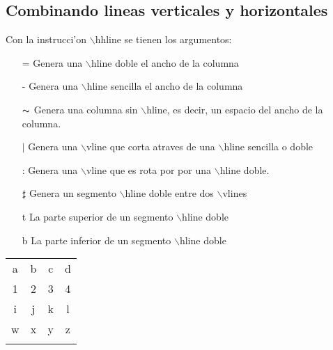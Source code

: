\documentclass [spanish,12pt]{article}
\begin{document}
\subsection{Combinando lineas verticales y horizontales}

Con la instrucci'on $\backslash$hhline se tienen los argumentos:

\begin{itemize}     %
\item[=] Genera una $\backslash$hline doble el ancho de la columna
\item[-] Genera una $\backslash$hline sencilla el ancho de la columna
\item[$\thicksim$] Genera una columna sin $\backslash$hline, es decir, un espacio del 
ancho de la columna.
\item[$|$] Genera una $\backslash$vline que corta atraves de una 
$\backslash$hline sencilla o doble
\item[:] Genera una $\backslash$vline que es rota por por una 
$\backslash$hline doble.
\item[$\sharp$] Genera un segmento $\backslash$hline doble entre dos 
$\backslash$vlines
\item[t] La parte superior de un segmento $\backslash$hline doble
\item[b] La parte inferior de un segmento $\backslash$hline doble
\end{itemize}

\setlength{\arrayrulewidth}{.8pt} %
\begin{tabular}{||cc||c|c||}
\hhline{|t:==:t:==:t|} 
a & b & c & d \\ \hhline{|:==:|~|~||}
1 & 2 & 3 & 4 \\ \hhline{#==#~|=#}
i & j & k & l \\ \hhline{||--||--||}
w & x & y & z \\ \hhline{|b:==:b:==:b|}
\end{tabular}
\end{document}
